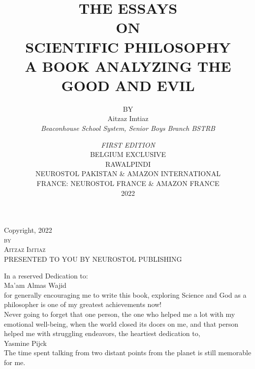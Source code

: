 \documentclass[a4paper,12pt]{book}[2004/02/16]
\providecommand{\pdfbookmark}[3][0]{}
\theoremstyle{ilemma}
\theoremstyle{itheorem}
\theoremstyle{iother}
\theoremstyle{icorollary}
\theoremstyle{numcorollary}
\theoremstyle{idefinition}
\begin{document}
\normalsize
\frontmatter
\title{\label{titlepage}\pdfbookmark[0]{Title Page.}{titlepage}%
THE ESSAYS \\
{\small ON}\\
{\Huge SCIENTIFIC PHILOSOPHY\\[1ex]}
{\Large A BOOK ANALYZING THE GOOD AND EVIL}
}

\author{{\small BY}\\
Aitzaz Imtiaz\\
\textit{Beaconhouse School System, Senior Boys Branch BSTRB}\\
}
\date{%
\textit{FIRST EDITION}\\
{\small BELGIUM EXCLUSIVE}\\
\vspace{0.2\textheight}
RAWALPINDI\\
NEUROSTOL PAKISTAN \& AMAZON INTERNATIONAL\\
\textsc{FRANCE: NEUROSTOL FRANCE \& AMAZON FRANCE}\\
2022
}
\maketitle
\begin{center}
\vspace*{0.4\textheight}
Copyright, 2022\\
\textsc{by\\
Aitzaz Imtiaz\\}
\vfill
PRESENTED TO YOU BY NEUROSTOL PUBLISHING
\end{center}
\newpage
\newpage
\begin{center}

In a reserved Dedication to:\\
\Huge
Ma'am Almas Wajid\\
\bigskip
\normalsize
for generally encouraging me to write this book, exploring Science and God as a philosopher is one of my greatest achievements now! \\
\bigskip
\bigskip
\bigskip
Never going to forget that one person, the one who helped me a lot with my emotional well-being, when the world closed its doors on me, and that person helped me with struggling endeavors, the heartiest dedication to,\\
\Huge
Yasmine Pijck\\
\bigskip
\normalsize
The time spent talking from two distant points from the planet is still memorable for me.\\
\end{center}
\end{document}
